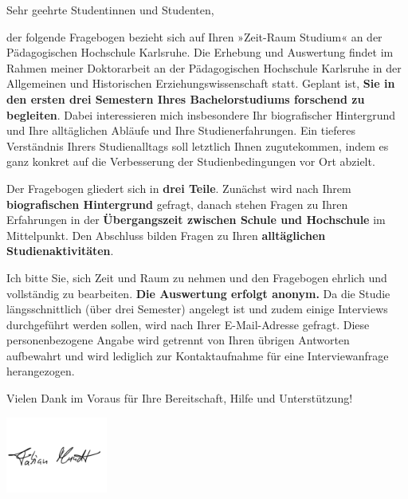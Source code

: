 

\begin{info}
\vspace{.5cm}

Sehr geehrte Studentinnen und Studenten,

\vspace{.5em}

der folgende Fragebogen bezieht sich auf Ihren »Zeit-Raum Studium« an der Pädagogischen Hochschule Karlsruhe. Die Erhebung und Auswertung findet im Rahmen meiner Doktorarbeit an der Pädagogischen Hochschule Karlsruhe in der Allgemeinen und Historischen Erziehungswissenschaft statt. Geplant ist, \textbf{Sie in den ersten drei Semestern Ihres Bachelorstudiums forschend zu begleiten}. Dabei interessieren mich insbesondere Ihr biografischer Hintergrund und Ihre alltäglichen Abläufe und Ihre Studienerfahrungen. Ein tieferes Verständnis Ihrers Studienalltags soll letztlich Ihnen zugutekommen, indem es ganz konkret auf die Verbesserung der Studienbedingungen vor Ort abzielt.

\vspace{.5em}

Der Fragebogen gliedert sich in \textbf{drei Teile}. Zunächst wird nach Ihrem \textbf{biografischen Hintergrund} gefragt, danach stehen Fragen zu Ihren Erfahrungen in der \textbf{Übergangszeit zwischen Schule und Hochschule} im Mittelpunkt. Den Abschluss bilden Fragen zu Ihren \textbf{alltäglichen Studienaktivitäten}.

\vspace{.5em}

Ich bitte Sie, sich Zeit und Raum zu nehmen und den Fragebogen ehrlich und vollständig zu bearbeiten. \textbf{Die Auswertung erfolgt anonym.} Da die Studie längsschnittlich (über drei Semester) angelegt ist und zudem einige Interviews durchgeführt werden sollen, wird nach Ihrer E-Mail-Adresse gefragt. Diese personenbezogene Angabe wird getrennt von Ihren übrigen Antworten aufbewahrt und wird lediglich zur Kontaktaufnahme für eine Interviewanfrage herangezogen.

\vspace{.5em}

Vielen Dank im Voraus für Ihre Bereitschaft, Hilfe und Unterstützung!

\vspace{-1cm}

\includegraphics[width=0.25\textwidth]{unterschrift.png}

\vspace{-1.5cm}
\end{info}

